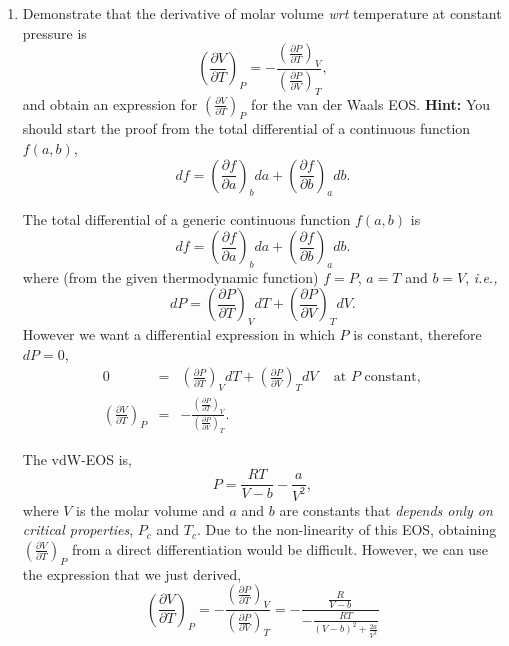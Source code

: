 \documentclass[12pts,a4paper,amsmath,amssymb,floatfix]{article}%
\newcommand{\frc}{\displaystyle\frac}
\newcommand{\ie}{{\it i.e., }}
\newcommand{\wrt}{{\it wrt }}
\newcommand{\Partial}[3][error]{\left(\frc{\partial #1}{\partial #2}\right)_{#3}}
\begin{document}
\begin{enumerate}[1)]
\begin{enumerate}[a)]
%
       \end{enumerate} 

\clearpage
\item\label{Mod03Ex02} Demonstrate that the derivative of molar volume \wrt temperature at constant pressure is
     \begin{displaymath}
         \Partial[V]{T}{P} = -\frc{\Partial[P]{T}{V}}{\Partial[P]{V}{T}},
     \end{displaymath}
     and obtain an expression for $\Partial[V]{T}{P}$ for the van der Waals EOS. {\bf Hint:} You should start the proof from the total differential of a continuous function $f(a,b)$,
     \begin{displaymath}
         df = \Partial[f]{a}{b}da + \Partial[f]{b}{a}db.
     \end{displaymath}

     The total differential of a generic continuous function $f(a,b)$ is
     \begin{displaymath}
         df = \Partial[f]{a}{b}da + \Partial[f]{b}{a}db.
     \end{displaymath}
     where (from the given thermodynamic function) $f=P$, $a=T$ and $b=V$, \ie
     \begin{displaymath}
         dP = \Partial[P]{T}{V}dT + \Partial[P]{V}{T}dV.
     \end{displaymath}
     However we want a differential expression in which $P$ is constant, therefore $dP = 0$,
     \begin{eqnarray}
         0 &=& \Partial[P]{T}{V}dT + \Partial[P]{V}{T}dV \;\;\;\text{ at } P \text{ constant},\nonumber \\
         \Partial[V]{T}{P} &=& -\frc{\Partial[P]{T}{V}}{\Partial[P]{V}{T}}.\nonumber
     \end{eqnarray}

     \medskip\noindent
     The vdW-EOS is,
     \begin{displaymath}
          P = \frc{RT}{V-b} - \frc{a}{V^{2}},
     \end{displaymath}
     where $V$ is the molar volume and $a$ and $b$ are constants that {\it depends only on critical properties}, $P_{c}$ and $T_{c}$. Due to the non-linearity of this EOS, obtaining $\Partial[V]{T}{P}$ from a direct differentiation would be difficult. However, we can use the expression that we just derived,
     \begin{displaymath}
         \Partial[V]{T}{P} = -\frc{\Partial[P]{T}{V}}{\Partial[P]{V}{T}} = -\frc{\frc{R}{V-b}}{-\frc{RT}{\left(V-b\right)^{2}+\frc{2a}{V^{3}}}}
     \end{displaymath} 


\end{enumerate}
\end{document}
